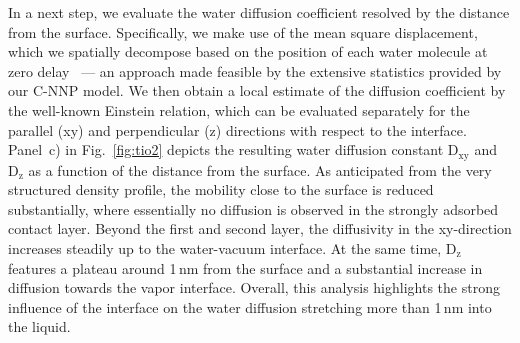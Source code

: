 \documentclass[aip,jcp,amsmath,amssymb,floatfix,reprint,citeautoscript,noeprint]{revtex4-1}
\begin{document}
\begin{bibunit}
%
In a next step, we evaluate the water diffusion coefficient
resolved by the distance from the  surface.
%
Specifically, we make use of the 
mean square displacement, which we spatially decompose
based on the position of each water molecule at zero delay~\cite{Pluharova2019/10.1021/acs.jctc.8b00111} ---
an approach made feasible by the extensive statistics
provided by our C-NNP model.
%
We then obtain a local estimate of the diffusion coefficient
by the well-known Einstein relation, which can be evaluated separately
for the parallel (xy) and perpendicular (z) directions with respect to the interface.
%
Panel~c) in Fig.~\ref{fig:tio2} depicts the resulting
water diffusion constant D$_\mathrm{xy}$ and D$_\mathrm{z}$
%
as a function of the distance from the  surface.
%
As anticipated from the very structured density profile,
the mobility close to the surface is reduced substantially,
where essentially no diffusion is observed in the strongly
adsorbed contact layer.
%
Beyond the first and second layer, the diffusivity in the xy-direction
increases steadily up to the water-vacuum interface.
%
At the same time, D$_\mathrm{z}$ features a plateau around 1\,nm from the surface and a substantial increase in diffusion towards the vapor interface.
%
%
Overall, this analysis highlights the strong influence of the
 interface on the water diffusion stretching more than
1\,nm into the liquid.



\end{bibunit}
\end{document}
